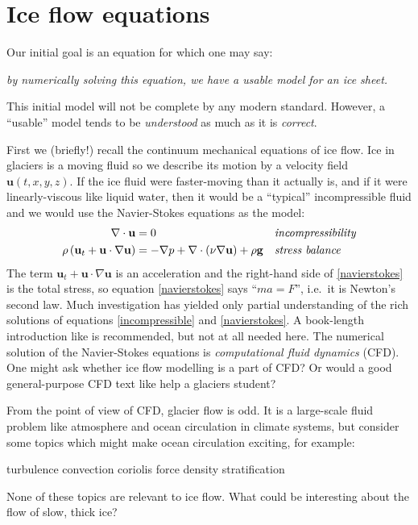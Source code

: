 \documentclass[letterpaper,final,12pt,reqno]{amsart}
\begin{document}
\section{Ice flow equations}  \label{sec:continuum}

Our initial goal is an equation for which one may say:
\begin{center}
\emph{by numerically solving this equation, we have a usable model for an ice sheet.}
\end{center}
\noindent This initial model will not be complete by any modern standard.  However, a ``usable'' model tends to be \emph{understood} as much as it is \emph{correct}.

First we (briefly!) recall the continuum mechanical equations of ice flow.  Ice in glaciers is a moving fluid so we describe its motion by a velocity field $\mathbf{u}(t,x,y,z)$.  If the ice fluid were faster-moving than it actually is, and if it were linearly-viscous like liquid water, then it would be a ``typical'' incompressible fluid and we would use the Navier-Stokes equations as the model:
\begin{align}
\nabla \cdot \mathbf{u} &= 0 &&\text{\emph{incompressibility}} \label{incompressible} \\
\rho \left(\mathbf{u}_t + \mathbf{u}\cdot\nabla \mathbf{u}\right) &= -\nabla p + \nabla \cdot (\nu \nabla \mathbf{u}) + \rho \mathbf{g} &&\text{\emph{stress balance}} \label{navierstokes}
\end{align}
The term $\mathbf{u}_t + \mathbf{u}\cdot\nabla \mathbf{u}$ is an acceleration and the right-hand side of \eqref{navierstokes} is the total stress, so equation \eqref{navierstokes} says ``$ma=F$'', i.e.~it is Newton's second law.  Much investigation has yielded only partial understanding of the rich solutions of equations \eqref{incompressible} and \eqref{navierstokes}.  A book-length introduction like \cite{Acheson} is recommended, but not at all needed here.  The numerical solution of the Navier-Stokes equations is \emph{computational fluid dynamics} (CFD).  One might ask whether ice flow modelling is a part of CFD?  Or would a good general-purpose CFD text like \cite{Wesseling} help a glaciers student?

From the point of view of CFD, glacier flow is odd.  It is a large-scale fluid problem like atmosphere and ocean circulation in climate systems, but consider some topics which might make ocean circulation exciting, for example:
  \begin{center} turbulence \qquad convection \qquad  coriolis force  \qquad density stratification
  \end{center}
None of these topics are relevant to ice flow.  What could be interesting about the flow of slow, thick ice?
\end{document}
